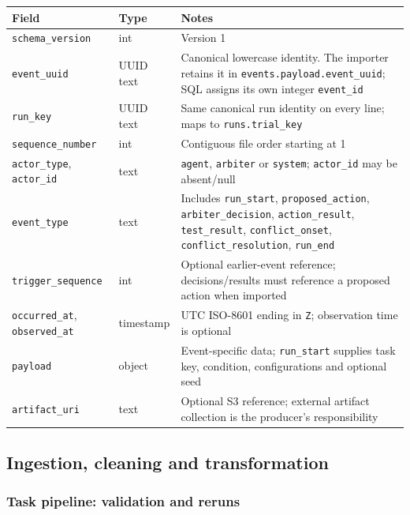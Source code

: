 \documentclass[11pt]{article}
\newcommand{\code}[1]{\texttt{#1}}
\begin{document}
{\small
\begin{tabularx}{\linewidth}{@{}L{3.6cm}L{1.8cm}Y@{}}
\toprule
\textbf{Field} & \textbf{Type} & \textbf{Notes} \\
\midrule
\code{schema\_version} & int & Version 1 \\
\code{event\_uuid} & UUID text & Canonical lowercase identity. The importer retains it in \code{events.payload.event\_uuid}; SQL assigns its own integer \code{event\_id} \\
\code{run\_key} & UUID text & Same canonical run identity on every line; maps to \code{runs.trial\_key} \\
\code{sequence\_number} & int & Contiguous file order starting at 1 \\
\code{actor\_type}, \code{actor\_id} & text & \code{agent}, \code{arbiter} or \code{system}; \code{actor\_id} may be absent/null \\
\code{event\_type} & text & Includes \code{run\_start}, \code{proposed\_action}, \code{arbiter\_decision}, \code{action\_result}, \code{test\_result}, \code{conflict\_onset}, \code{conflict\_resolution}, \code{run\_end} \\
\code{trigger\_sequence} & int & Optional earlier-event reference; decisions/results must reference a proposed action when imported \\
\code{occurred\_at}, \code{observed\_at} & timestamp & UTC ISO-8601 ending in \code{Z}; observation time is optional \\
\code{payload} & object & Event-specific data; \code{run\_start} supplies task key, condition, configurations and optional seed \\
\code{artifact\_uri} & text & Optional S3 reference; external artifact collection is the producer's responsibility \\
\bottomrule
\end{tabularx}
}

\subsection*{Ingestion, cleaning and transformation}

\subsubsection*{Task pipeline: validation and reruns}
\end{document}
